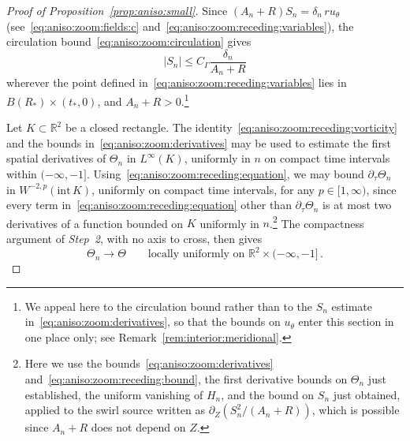 \documentclass[11pt,reqno]{amsproc}
\numberwithin{equation}{section}
\theoremstyle{remark}
\newcommand{\p}{\partial}
\newcommand{\RR}{\mathbb R}
\begin{document}
\begin{proof}[Proof of Proposition~\ref{prop:aniso:small}]
Since $(A_n+R)S_n=\delta_n\,ru_\theta$ (see~\eqref{eq:aniso:zoom:fields:c} and~\eqref{eq:aniso:zoom:receding:variables}), the circulation bound~\eqref{eq:aniso:zoom:circulation} gives
\[
|S_n|\le C_\Gamma \frac{\delta_n}{A_n+R}
\]
wherever the point defined in~\eqref{eq:aniso:zoom:receding:variables} lies in $B(R_*)\times(t_*,0)$, and $A_n+R>0$.\footnote{We appeal here to the circulation bound rather than to the $S_n$ estimate in~\eqref{eq:aniso:zoom:derivatives}, so that the bounds on $u_\theta$ enter this section in one place only; see Remark~\ref{rem:interior:meridional}.}

Let $K\subset\RR^2$ be a closed rectangle. The identity~\eqref{eq:aniso:zoom:receding:vorticity} and the bounds in~\eqref{eq:aniso:zoom:derivatives} may be used to estimate the first spatial derivatives of $\Theta_n$ in $L^\infty(K)$, uniformly in $n$ on compact time intervals within $(-\infty,-1]$. Using~\eqref{eq:aniso:zoom:receding:equation}, we may bound $\p_\tau\Theta_n$ in $W^{-2,p}(\mathrm{int}\,K)$, uniformly on compact time intervals, for any $p\in[1,\infty)$, since every term in~\eqref{eq:aniso:zoom:receding:equation} other than $\p_\tau\Theta_n$ is at most two derivatives of a function bounded on $K$ uniformly in $n$.\footnote{Here we use the bounds~\eqref{eq:aniso:zoom:derivatives} and~\eqref{eq:aniso:zoom:receding:bound}, the first derivative bounds on $\Theta_n$ just established, the uniform vanishing of $H_n$, and the bound on $S_n$ just obtained, applied to the swirl source written as $\p_Z(S_n^2/(A_n+R))$, which is possible since $A_n+R$ does not depend on $Z$.} The compactness argument of \emph{Step~2}, with no axis to cross, then gives
\[
\Theta_n\to\Theta \qquad \mbox{locally uniformly on } \RR^2\times(-\infty,-1] \,.
\]


\end{proof}
\end{document}
